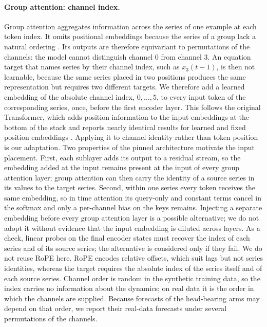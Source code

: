 \paragraph{Group attention: channel index.}
Group attention aggregates information across the series of one example at
each token index. It omits positional embeddings because the series of a
group lack a natural ordering \citep[p.~6]{ansari2025chronos2}. Its outputs
are therefore equivariant to permutations of the channels: the model cannot
distinguish channel 0 from channel 3. An equation target that names series by
their channel index, such as $x_3(t-1)$, is then not learnable, because the
same series placed in two positions produces the same representation but
requires two different targets. We therefore add a learned embedding of the
absolute channel index, $0,\ldots,5$, to every input token of the
corresponding series, once, before the first encoder layer. This follows
the original Transformer, which adds position information to the input
embeddings at the bottom of the stack and reports nearly identical results
for learned and fixed position embeddings \citep[Section~3.5 and Table~3,
row~E]{vaswani2017attention}. Applying it to channel identity rather than
token position is our adaptation. Two properties of the pinned architecture
motivate the input placement. First, each sublayer adds its output to a
residual stream, so the embedding added at the input remains present at the
input of every group attention layer; group attention can then carry the
identity of a source series in its values to the target series. Second,
within one series every token receives the same embedding, so in time
attention its query-only and constant terms cancel in the softmax and only a
per-channel bias on the keys remains. Injecting a separate embedding before
every group attention layer is a possible alternative; we do not adopt it
without evidence that the input embedding is diluted across layers. As a
check, linear probes on the final encoder states must recover the index of
each series and of its source series; the alternative is considered only if
they fail. We do not reuse RoPE here. RoPE encodes relative offsets, which suit lags but not
series identities, whereas the target requires the absolute index of the
series itself and of each source series. Channel order is random in the
synthetic training data, so the index carries no information about the
dynamics; on real data it is the order in which the channels are supplied.
Because forecasts of the head-bearing arms may depend on that order, we report
their real-data forecasts under several permutations of the channels.

